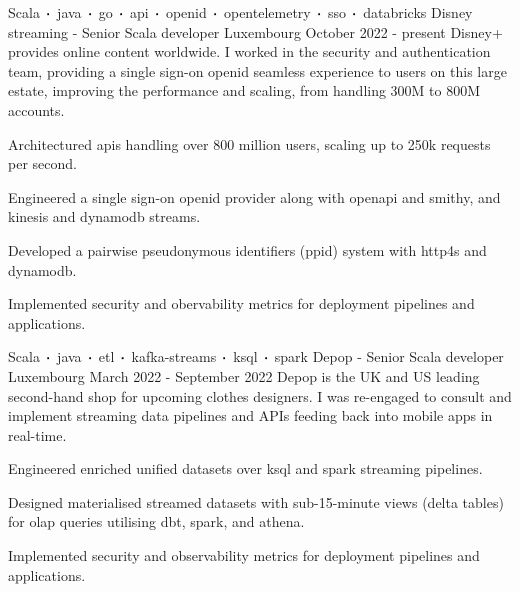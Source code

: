 
\newcommand*{\logo}[2]{\raisebox{-0.2em}{\texttt{[image: \#2]}}\hspace{0.25em}#1}
\newcommand*{\logoonly}[1]{\raisebox{-0.2em}{\texttt{[image: \#1]}}}

\begin{cventries}
    \cventry
    {Scala$\sqbig$java$\sqbig$go$\sqbig$api$\sqbig$openid$\sqbig$opentelemetry$\sqbig$sso$\sqbig$databricks}
    {\logo{Disney streaming}{../../../images/disney.png} - Senior Scala developer}
    {Luxembourg}
    {October 2022 - present}
    {Disney+ provides online content worldwide. I worked in the security and authentication team, providing a single sign-on openid seamless experience to users on this large estate, improving the performance and scaling, from handling 300M to 800M accounts.}
    {
        \begin{cvitems}
            \item{Architectured apis handling over 800 million users, scaling up to 250k requests per second.}
            \item{Engineered a single sign-on openid provider along with openapi and smithy, and kinesis and dynamodb streams.}
            \item{Developed a pairwise pseudonymous identifiers (ppid) system with http4s and dynamodb.}
            \item{Implemented security and obervability metrics for deployment pipelines and applications.}
        \end{cvitems}
    }

    \cventry
    {Scala$\sqbig$java$\sqbig$etl$\sqbig$kafka-streams$\sqbig$ksql$\sqbig$spark}
    {\logo{Depop}{../../../images/depop.jpg} - Senior Scala developer}
    {Luxembourg}
    {March 2022 - September 2022}
    {Depop is the UK and US leading second-hand shop for upcoming clothes designers. I was re-engaged to consult and implement streaming data pipelines and APIs feeding back into mobile apps in real-time.}
    {
        \begin{cvitems}
            \item{Engineered enriched unified datasets over ksql and spark streaming pipelines.}
            \item{Designed materialised streamed datasets with sub-15-minute views (delta tables) for olap queries utilising dbt, spark, and athena.}
            \item{Implemented security and observability metrics for deployment pipelines and applications.}
        \end{cvitems}
    }


\end{cventries}
